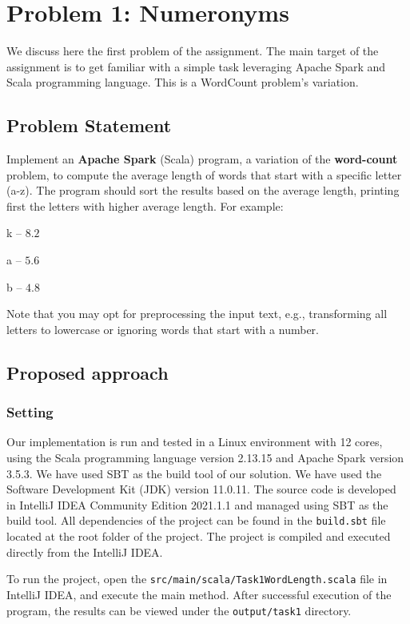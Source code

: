 \documentclass[acmlarge]{acmart}
\begin{document}
\section{Problem 1: Numeronyms}
\label{sec:problem1}
We discuss here the first problem of the assignment.
The main target of the assignment is to get familiar with a simple task leveraging Apache Spark and Scala programming language. This is a WordCount problem's variation.

\subsection{Problem Statement}
Implement an \textbf{Apache Spark} (Scala) program, a variation of the \textbf{word-count} problem, to compute the average length of words that start with a specific letter (a-z). The program should sort the results based on the average length, printing first the letters with higher average length. For example:
\begin{description}
  \item k – $8.2$
  \item a – $5.6$
  \item b – $4.8$
\end{description}
Note that you may opt for preprocessing the input text, e.g., transforming all letters to lowercase or ignoring words that start with a number.

\subsection{Proposed approach}
\subsubsection{Setting}
Our implementation is run and tested in a Linux environment with 12 cores, using the Scala programming language version 2.13.15 and Apache Spark version 3.5.3. We have used SBT as the build tool of our solution.
We have used the Software Development Kit (JDK) version 11.0.11.
The source code is developed in IntelliJ IDEA Community Edition 2021.1.1 and managed using SBT as the build tool. All dependencies of the project can be found in the \texttt{build.sbt} file located at the root folder of the project.
The project is compiled and executed directly from the IntelliJ IDEA.

To run the project, open the \texttt{src/main/scala/Task1WordLength.scala} file in IntelliJ IDEA, and execute the main method. After successful execution of the program, the results can be viewed under the \texttt{output/task1} directory.
\end{document}
